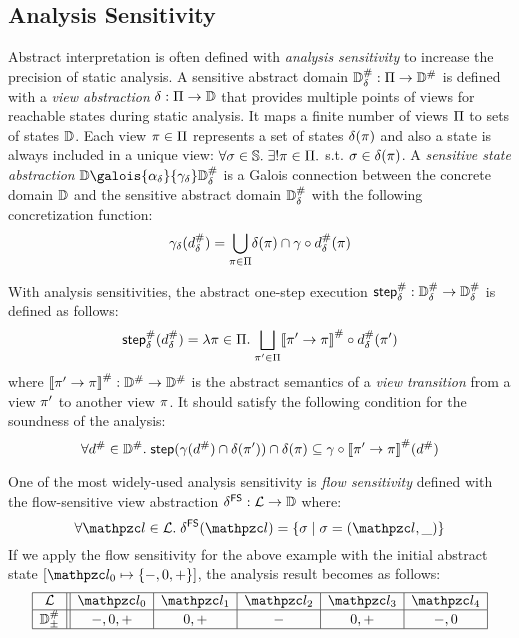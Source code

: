 \subsection{Analysis Sensitivity}\label{sec:sens}

Abstract interpretation is often defined with \textit{analysis sensitivity} to
increase the precision of static analysis.  A sensitive abstract domain
${\mathbb{D}}^{\#}_\delta: \Pi \rightarrow {\mathbb{D}}^{\#}$ is defined with a \textit{view
abstraction} $\delta: \Pi \rightarrow \mathbb{D}$ that provides multiple points
of views for reachable states during static analysis.  It maps a finite number
of views $\Pi$ to sets of states $\mathbb{D}$. Each view $\pi \in \Pi$
represents a set of states $\delta(\pi)$ and also a state is always included
in a unique view: $\forall \sigma \in \mathbb{S}. \; \exists! \pi \in
\Pi.$ s.t. $\sigma \in \delta(\pi)$.  A \textit{sensitive state
abstraction} $\dom \galois{\alpha_\viewmap}{\gamma_\viewmap} \sabsdom$ is a
Galois connection between the concrete domain $\mathbb{D}$ and the sensitive abstract
domain ${\mathbb{D}}^{\#}_\delta$ with the following concretization function:
\[
  \gamma_\delta({{d}^{\#}_\delta}) = \underset{\pi \in \Pi}{\bigcup}
  {\delta(\pi) \cap \gamma \circ {{d}^{\#}_\delta}(\pi)}
\]

With analysis sensitivities, the abstract one-step execution ${\textsf{step}}^{\#}_\delta:
{\mathbb{D}}^{\#}_\delta \rightarrow {\mathbb{D}}^{\#}_\delta$ is defined as follows:
\[
  {\textsf{step}}^{\#}_\delta({{d}^{\#}_\delta}) = \lambda \pi \in \Pi. \; \underset{\pi' \in
  \Pi}{\bigsqcup}{{[\![{\pi' \rightarrow \pi}]\!]}^{\#} \circ {{d}^{\#}_\delta}(\pi')}
\]
where ${[\![{\pi' \rightarrow \pi}]\!]}^{\#}: {\mathbb{D}}^{\#} \rightarrow {\mathbb{D}}^{\#}$ is the abstract
semantics of a \textit{view transition} from a view $\pi'$ to another view
$\pi$.  It should satisfy the following condition for the soundness of the
analysis:
\[
  \forall {d}^{\#} \in {\mathbb{D}}^{\#}. \; \textsf{step}(\gamma({d}^{\#}) \cap \delta(\pi'))
  \cap \delta(\pi) \subseteq \gamma \circ
  {[\![{\pi' \rightarrow \pi}]\!]}^{\#}({d}^{\#})
\]

One of the most widely-used analysis sensitivity is \textit{flow sensitivity}
defined with the flow-sensitive view abstraction $\delta^{\textsf{FS}}: \mathcal{L}
\rightarrow \mathbb{D}$ where:
\[
  \forall \lab\in\labset. \; \fsviewmap(\lab) = \{ \st \mid \st = (\lab, \_) \}
\]
If we apply the flow sensitivity for the above example with the initial abstract
state $[ \lab_0 \mapsto \{ -, 0, + \} ]$, the analysis result becomes as follows:
\[
  \begin{array}{|c||c|c|c|c|c|}\hline
    \labset & \lab_0 & \lab_1 & \lab_2 & \lab_3 & \lab_4\\\hline
    \absdom_\pm & -, 0, + & 0, + & - & 0, + & -, 0\\\hline
  \end{array}
\]


